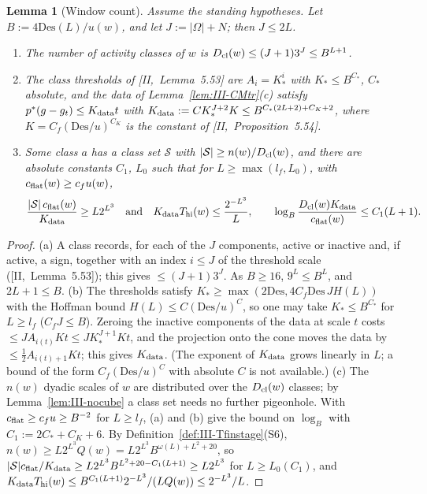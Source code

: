 \documentclass[10pt]{amsart}
\newtheorem{lemma}[theorem]{Lemma}
\theoremstyle{definition}
\theoremstyle{remark}
\begin{document}
\begin{lemma}[Window count]\label{lem:III-count}
Assume the standing hypotheses.  Let $B:=4\mathrm{Des}(L)/u(w)$, and let
$J:=|\Omega|+N$; then $J\le2L$.
\begin{enumerate}
\item[(a)] The number of activity classes of $w$ is $D_{\rm cl}(w)\le(J+1)3^J\le
B^{L+1}$.
\item[(b)] The class thresholds of [II,~Lemma~5.53] are $A_i=K_*^i$ with
$K_*\le B^{C_*}$, $C_*$ absolute, and the data of
Lemma~\textup{\ref{lem:III-CMtr}(c)} satisfy $p^*(g-g_t)\le K_{\rm data}t$ with
$K_{\rm data}:=CK_*^{J+2}K\le B^{C_*(2L+2)+C_K+2}$, where $K=C_f(\mathrm{Des}/u)^{C_K}$
is the constant of [II,~Proposition~5.54].
\item[(c)] Some class $a$ has a class set $\mathcal S$ with $|\mathcal S|\ge
n(w)/D_{\rm cl}(w)$, and there are absolute constants $C_1$, $L_0$ such that for
$L\ge\max(l_f,L_0)$, with $c_{\rm flat}(w)\ge c_fu(w)$,
\[
 \frac{|\mathcal S|\,c_{\rm flat}(w)}{K_{\rm data}}\ge L2^{L^3}\quad\text{and}\quad
 K_{\rm data}T_{\rm hi}(w)\le\frac{2^{-L^3}}L ,\qquad
 \log_B\frac{D_{\rm cl}(w)K_{\rm data}}{c_{\rm flat}(w)}\le C_1(L+1).
\]
\end{enumerate}
\end{lemma}

\begin{proof}
(a) A class records, for each of the $J$ components, active or inactive and,
if active, a sign, together with an index $i\le J$ of the threshold scale
([II,~Lemma~5.53]); this gives $\le(J+1)3^J$.  As $B\ge16$, $9^L\le B^L$, and
$2L+1\le B$.  (b) The thresholds satisfy $K_*\ge\max(2\mathrm{Des},4C_f\mathrm{Des}\,J
H(L))$ with the Hoffman bound $H(L)\le C(\mathrm{Des}/u)^C$, so one may take
$K_*\le B^{C_*}$ for $L\ge l_f$ ($C_fJ\le B$).  Zeroing the inactive components
of the data at scale $t$ costs $\le JA_{i(t)}Kt\le JK_*^{J+1}Kt$, and the
projection onto the cone moves the data by $\le\frac12A_{i(t)+1}Kt$; this gives
$K_{\rm data}$.  (The exponent of $K_{\rm data}$ grows linearly in $L$; a bound of
the form $C_f(\mathrm{Des}/u)^C$ with absolute $C$ is not available.)  (c) The
$n(w)$ dyadic scales of $w$ are distributed over the $D_{\rm cl}(w)$ classes;
by Lemma~\ref{lem:III-nocube} a class set needs no further pigeonhole.  With
$c_{\rm flat}\ge c_fu\ge B^{-2}$ for $L\ge l_f$, (a) and (b) give the bound on
$\log_B$ with $C_1:=2C_*+C_K+6$.  By Definition~\ref{def:III-Tfinstage}(S6),
$n(w)\ge L2^{L^3}Q(w)=L2^{L^3}B^{\omega(L)+L^2+20}$, so
$|\mathcal S|c_{\rm flat}/K_{\rm data}\ge L2^{L^3}B^{L^2+20-C_1(L+1)}\ge L2^{L^3}$ for
$L\ge L_0(C_1)$, and $K_{\rm data}T_{\rm hi}(w)\le B^{C_1(L+1)}2^{-L^3}/(LQ(w))\le
2^{-L^3}/L$.
\end{proof}
\end{document}
